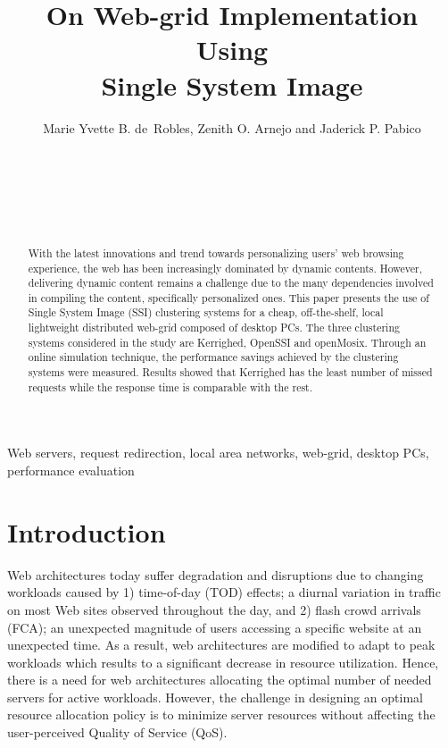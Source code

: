 \documentclass[preprint]{acm_proc_article-sp}
\newcommand{\UPLB}{University of the Philippines Los Ba\~{n}os}
\begin{document}
\title{On Web-grid Implementation Using\\ Single System Image}
\author{
\alignauthor Marie Yvette B. de~Robles, Zenith O. Arnejo and Jaderick P. Pabico\\
   \\
   \\
   \affaddr{\UPLB}\\
   \\
   \\
}
\date{}

\maketitle

\begin{abstract}
With the latest innovations and trend towards personalizing users' web browsing experience, the web has been increasingly dominated by dynamic contents. However, delivering dynamic content remains a challenge due to the many dependencies involved in compiling the content, specifically personalized ones. This paper presents the use of Single System Image (SSI) clustering systems for a cheap, off-the-shelf, local lightweight distributed web-grid composed of desktop PCs. The three clustering systems considered in the study are Kerrighed, OpenSSI and openMosix. Through an online simulation technique, the performance savings achieved by the clustering systems were measured. Results showed that Kerrighed has the least number of missed requests while the response time is comparable with the rest.
\end{abstract}

\begin{keywords}
Web servers, request redirection, local area networks, web-grid, desktop PCs, performance evaluation
\end{keywords}

\section{Introduction}
Web architectures today suffer degradation and disruptions due to changing workloads caused by 1) time-of-day (TOD) effects; a diurnal variation in traffic on most Web sites observed throughout the day, and 2) flash crowd arrivals (FCA); an unexpected magnitude of users accessing a specific website at an unexpected time. As a result, web architectures are modified to adapt to peak workloads which results to a significant decrease in resource utilization. Hence, there is a need for web architectures allocating the optimal number of needed servers for active workloads. However, the challenge in designing an optimal resource allocation policy is to minimize server resources without affecting the user-perceived Quality of Service (QoS).
\end{document}
